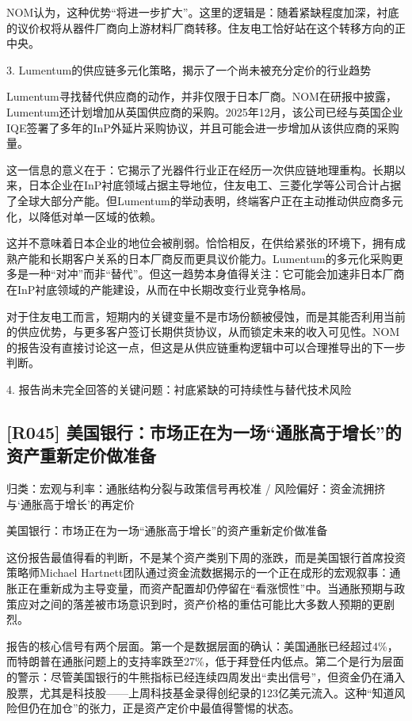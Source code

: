 \documentclass[11pt]{ctexart}
\begin{document}
NOM认为，这种优势“将进一步扩大”。这里的逻辑是：随着紧缺程度加深，衬底的议价权将从器件厂商向上游材料厂商转移。住友电工恰好站在这个转移方向的正中央。

3. Lumentum的供应链多元化策略，揭示了一个尚未被充分定价的行业趋势

Lumentum寻找替代供应商的动作，并非仅限于日本厂商。NOM在研报中披露，Lumentum还计划增加从英国供应商的采购。2025年12月，该公司已经与英国企业IQE签署了多年的InP外延片采购协议，并且可能会进一步增加从该供应商的采购量。

这一信息的意义在于：它揭示了光器件行业正在经历一次供应链地理重构。长期以来，日本企业在InP衬底领域占据主导地位，住友电工、三菱化学等公司合计占据了全球大部分产能。但Lumentum的举动表明，终端客户正在主动推动供应商多元化，以降低对单一区域的依赖。

这并不意味着日本企业的地位会被削弱。恰恰相反，在供给紧张的环境下，拥有成熟产能和长期客户关系的日本厂商反而更具议价能力。Lumentum的多元化采购更多是一种“对冲”而非“替代”。但这一趋势本身值得关注：它可能会加速非日本厂商在InP衬底领域的产能建设，从而在中长期改变行业竞争格局。

对于住友电工而言，短期内的关键变量不是市场份额被侵蚀，而是其能否利用当前的供应优势，与更多客户签订长期供货协议，从而锁定未来的收入可见性。NOM的报告没有直接讨论这一点，但这是从供应链重构逻辑中可以合理推导出的下一步判断。

4. 报告尚未完全回答的关键问题：衬底紧缺的可持续性与替代技术风险

\subsection{[R045] 美国银行：市场正在为一场“通胀高于增长”的资产重新定价做准备}
{\small\color{refgray}归类：宏观与利率：通胀结构分裂与政策信号再校准 / 风险偏好：资金流拥挤与‘通胀高于增长’的再定价}

美国银行：市场正在为一场“通胀高于增长”的资产重新定价做准备

这份报告最值得看的判断，不是某个资产类别下周的涨跌，而是美国银行首席投资策略师Michael Hartnett团队通过资金流数据揭示的一个正在成形的宏观叙事：通胀正在重新成为主导变量，而资产配置却仍停留在“看涨惯性”中。当通胀预期与政策应对之间的落差被市场意识到时，资产价格的重估可能比大多数人预期的更剧烈。

报告的核心信号有两个层面。第一个是数据层面的确认：美国通胀已经超过4\%，而特朗普在通胀问题上的支持率跌至27\%，低于拜登任内低点。第二个是行为层面的警示：尽管美国银行的牛熊指标已经连续四周发出“卖出信号”，但资金仍在涌入股票，尤其是科技股——上周科技基金录得创纪录的123亿美元流入。这种“知道风险但仍在加仓”的张力，正是资产定价中最值得警惕的状态。
\end{document}
